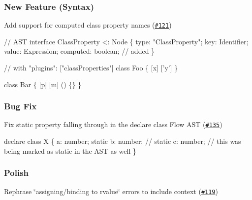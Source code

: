 \subsubsection*{New Feature (Syntax)}


\begin{DoxyItemize}
\item Add support for computed class property names (\href{https://github.com/babel/babylon/pull/121}{\tt \#121}) 
\end{DoxyItemize}


\begin{DoxyCode}
// AST
interface ClassProperty <: Node \{
  type: "ClassProperty";
  key: Identifier;
  value: Expression;
  computed: boolean; // added
\}
\end{DoxyCode}



\begin{DoxyCode}
// with "plugins": ["classProperties"]
class Foo \{
  [x]
  ['y']
\}

class Bar \{
  [p]
  [m] () \{\}
\}
\end{DoxyCode}


\subsubsection*{Bug Fix}


\begin{DoxyItemize}
\item Fix {\ttfamily static} property falling through in the declare class Flow A\+ST (\href{https://github.com/babel/babylon/pull/135}{\tt \#135}) 
\end{DoxyItemize}


\begin{DoxyCode}
declare class X \{
    a: number;
    static b: number; // static
    c: number; // this was being marked as static in the AST as well
\}
\end{DoxyCode}


\subsubsection*{Polish}


\begin{DoxyItemize}
\item Rephrase \char`\"{}assigning/binding to rvalue\char`\"{} errors to include context (\href{https://github.com/babel/babylon/pull/119}{\tt \#119}) 
\end{DoxyItemize}


